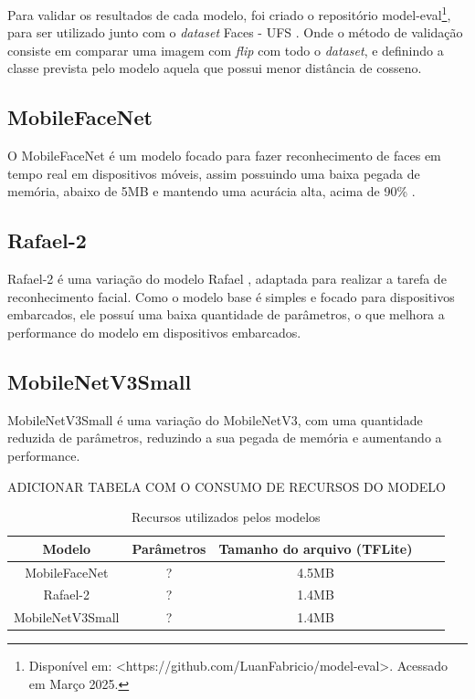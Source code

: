 Para validar os resultados de cada modelo, foi criado o repositório model-eval\footnote{
Disponível em: <https://github.com/LuanFabricio/model-eval>. Acessado em Março 2025.}, para ser utilizado junto com o
\textit{dataset} Faces - UFS \cite{leandro}.
Onde o método de validação consiste em comparar uma imagem com \textit{flip} com todo o \textit{dataset}, e definindo
a classe prevista pelo modelo aquela que possui menor distância de cosseno.
\subsection{MobileFaceNet}

O MobileFaceNet é um modelo focado para fazer reconhecimento de faces em tempo real em dispositivos móveis,
assim possuindo uma baixa pegada de memória, abaixo de 5MB e mantendo uma acurácia alta, acima de 90\% \cite{leandro}.

\subsection{Rafael-2}
Rafael-2 é uma variação do modelo Rafael \cite{rafael}, adaptada para realizar a tarefa de reconhecimento facial.
Como o modelo base é simples e focado para dispositivos embarcados, ele possuí uma baixa quantidade de parâmetros,
 o que melhora a performance do modelo em dispositivos embarcados.

\subsection{MobileNetV3Small}
MobileNetV3Small é uma variação do MobileNetV3, com uma quantidade reduzida de parâmetros, reduzindo a sua pegada de
memória e aumentando a performance.

ADICIONAR TABELA COM O CONSUMO DE RECURSOS DO MODELO
\begin{center}
\begin{table}[htb]
\centering
\ABNTEXfontereduzida
\caption[Recursos utilizados pelos modelos]{Recursos utilizados pelos modelos}
\label{tabela_acuracia_1}
\begin{tabular}{ |c|c|c|c|c| }
	\hline
	\textbf{Modelo} & \textbf{Parâmetros} & \textbf{Tamanho do arquivo (TFLite)} \\
	\hline
	MobileFaceNet 		& ? 	& 4.5MB \\
	Rafael-2 		& ? 	& 1.4MB \\
	MobileNetV3Small 	& ? 	& 1.4MB \\
	\hline
\end{tabular}
\end{table}
\end{center}

